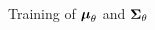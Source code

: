 \documentclass[aspectratio=169, 9pt]{beamer}
\theoremstyle{definition}
\begin{document}
\begin{frame}{Training of ${\boldsymbol{\mu}}_\theta$ and  ${\boldsymbol{\Sigma}}_\theta$}
\begin{columns}
\begin{column}{0.45\textwidth}
\begin{columns}
\begin{column}{0.35\textwidth}
        \end{column}
      \end{columns}
    \end{column}
  \end{columns}
\end{frame}
\end{document}
